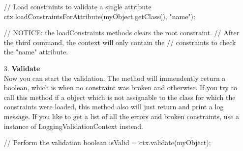 \begin{itemize}
\begin{example}[style=java, title={Three different ways to load constraints}]
	// Load constraints to validate a single attribute
	ctx.loadConstraintsForAttribute(myObject.getClass(), "name");
	
	// NOTICE: the loadConstraints methods clears the root constraint.
	// After the third command, the context will only contain the 
	// constraints to check the "name" attribute.
\end{example}
\item[3.] \textbf{Validate} \\
Now you can start the validation. The method  will immendently return a boolean, which is  when no constraint was broken and  otherwise. If you try to call this method if a object which is not assignable to the class for which the constraints were loaded, this method also will just return  and print a log message. If you like to get a list of all the errors and broken constraints, use a instance of LoggingValidationContext instead.
\begin{example}[style=java, title={Validate}]
	// Perform the validation
	boolean isValid = ctx.validate(myObject);
\end{example}
\end{itemize}

